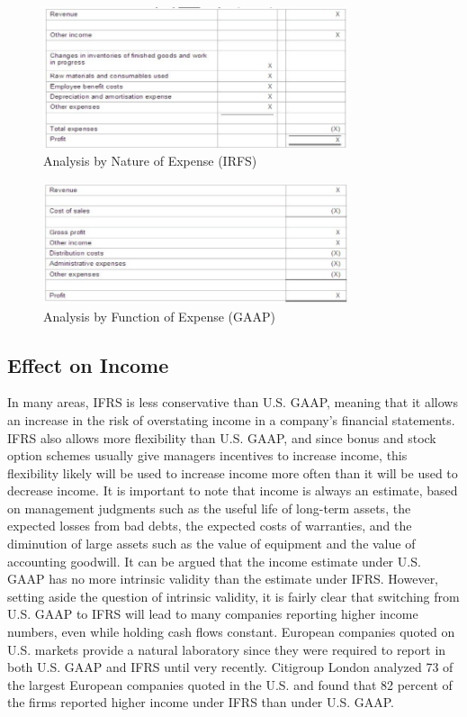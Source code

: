 \begin{figure}[h]
\caption{Analysis by Nature of Expense (IRFS)}
\centering
\includegraphics[width=0.8\textwidth]{images/natureOfExpenses.png}
\end{figure}

\begin{figure}[h]
\caption{Analysis by Function of Expense (GAAP)}
\centering
\includegraphics[width=0.8\textwidth]{images/functionOfExpenses.png}
\end{figure}

\clearpage
\subsection{Effect on Income}
In many areas, IFRS is less conservative than U.S. GAAP, meaning that it allows an increase in the risk of overstating income in a company’s financial statements. IFRS also allows more flexibility than U.S. GAAP, and since bonus and stock option schemes usually give managers incentives to increase income, this flexibility likely will be used to increase income more often than it will be used to decrease income. It is important to note that income is always an estimate, based on management judgments such as the useful life of long-term assets, the expected losses from bad debts, the expected costs of warranties, and the diminution of large assets such as the value of equipment and the value of accounting goodwill. It can be argued that the income estimate under U.S. GAAP has no more intrinsic validity than the estimate under IFRS. However, setting aside the question of intrinsic validity, it is fairly clear that switching from U.S. GAAP to IFRS will lead to many companies reporting higher income numbers, even while holding cash flows constant. European companies quoted on U.S. markets provide a natural laboratory since they were required to report in both U.S. GAAP and IFRS until very recently. Citigroup London analyzed 73 of the largest European companies quoted in the U.S. and found that 82 percent of the firms reported higher income under IFRS than under U.S. GAAP.

